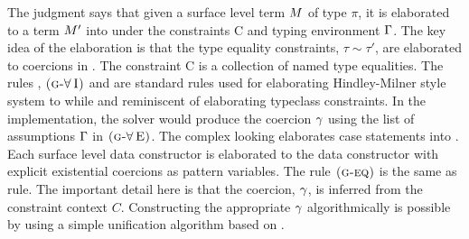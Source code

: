 \documentclass[manuscript,screen,nonacm]{acmart}
\begin{document}
\newcommand\GADTVar{
 \ib{\irule[\trule{g-var}]
 {x\co\pi \in \TEnv};
 {\GTranslate C \TEnv x {\pi} x}
 }
}
\newcommand\GADTEq{
 \ib{\irule[\trule{g-eq}]
 {\GTranslate C \TEnv \Tm \tau \Tm'}
 {\CoKinding C \Co {\tau \sim \tau'}};
 {\GTranslate C \TEnv \Tm {\tau'} {\Cast {\Tm'} \Co}}
 }
}
\newcommand\GADTForallI{
 \ib{\irule[\trule{g-$\I\forall$}]
 {\GTranslate C \TEnv \Tm \pi \Tm'}
 {\fresh \TyVar {C, \TEnv}};
 {\GTranslate C \TEnv \Tm {\Forall {\TyVar\co\star} \pi} {\TLam {\TyVar\co\star} \Tm'}}
 }
}
\newcommand\GADTForallE{
 \ib{\irule[\trule{g-$\E\forall$}]
 {\GTranslate C \TEnv \Tm {\Forall {\TyVar\co\star} \pi} \Tm'};
 {\GTranslate C \TEnv \Tm {\Set{\TyVar\mapsto\tau}\pi} {\Tm'\App \tau}}
 }
}
\newcommand\GADTCI{
 \ib{\irule[\trule{g-$\I C$}]
 {\GTranslate {C,c:\tau\sim\tau'} \TEnv \Tm {\eta} \Tm'};
 {\GTranslate C \TEnv \Tm {\tau\sim\tau'\then\eta} {\TLam {(c\co\tau\sim\tau')} \Tm'}}
 }
}
\newcommand\GADTCE{
 \ib{\irule[\trule{g-$\E C$}]
 {\GTranslate {C} \TEnv \Tm {\tau\sim\tau'\then\eta} \Tm'}
 {\CoKinding C \Co \tau\sim\tau'};
 {\GTranslate C \TEnv \Tm {\eta} {\Tm'\App\Co}}
 }
}
\newcommand\GADTAlt{
 \ib{\irule[\trule{g-alt}]
 {\substack{
 \mathlarger{H\co \Forall {\many\TyVar} {\Forall {\many\beta} {\many{\tau'\sim\tau''} \then \many\tau \to T\many\TyVar}}}\quad
 \mathlarger{\many\TyVar \cap \many\beta = \varnothing}\quad
 \mathlarger{\fvs{\many\tau, \many{\tau'}, \many{\tau''}} = \fvs{\many\TyVar, \many\beta}}\quad
 \mathlarger{\Subst = \Set{\many{\TyVar\mapsto v}}}\quad
 \mathlarger{\fresh {\many{c}} {C, \TEnv}}\\
 \mathlarger{\GTranslate {C,\many{c\co\Subst{\tau'}\sim\Subst\tau''}\,} {\,\TEnv,\many{x\co\Subst\tau}\,} \Tm {\tau'} \Tm'} }};
 {\GTranslate C \TEnv {H\App\many x \to \Tm} {T\App\many v \to \tau'}
 {H\App(\many{\beta\co\star})\App(\many{c\co\Subst\tau'\sim\Subst\tau''})\App(\many{x\co\Subst\tau}) \to \Tm' }}
 }
}


The judgment  says that given a surface level term $M$ of type $\pi$, it is elaborated to a term $M'$ into \SFC under the constraints C and typing environment $\Gamma$. The key idea of the elaboration is that the type equality constraints, $\tau\sim\tau'$, are elaborated to coercions in \SFC. The constraint C is a collection of named type equalities. The rules , $\textsc{(g-\ensuremath{\mathord{\forall}}\!~I)}$ and  are standard rules used for elaborating Hindley-Milner style system\cite{TODO} to \SF while  and  reminiscent of elaborating typeclass constraints. In the implementation, the solver would produce the coercion $\gamma$ using the list of assumptions $\Gamma$ in $\textsc{(g-\ensuremath{\mathord{\forall}}\!~E)}$. The complex looking  elaborates case statements into \SFC. Each surface level data constructor is elaborated to the \SFC data constructor with explicit existential coercions as pattern variables. The rule $\textsc{(g-eq)}$ is the same as  rule. The important detail here is that the coercion, $\gamma$, is inferred from the constraint context $C$. Constructing the appropriate $\gamma$ algorithmically is possible by using a simple unification algorithm based on \cite{lassez_unification_1988}.
\end{document}

